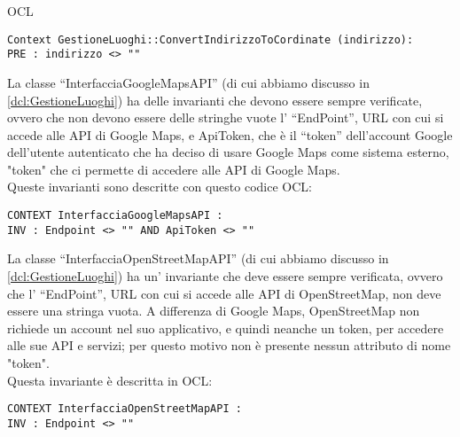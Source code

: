 \begin{listaPersonale}{OCL}
    \begin{lstlisting}
Context GestioneLuoghi::ConvertIndirizzoToCordinate (indirizzo):
PRE : indirizzo <> ""
    \end{lstlisting}




    \begin{center}
        
    \end{center}
    La classe “InterfacciaGoogleMapsAPI” (di cui abbiamo discusso in \ref{dcl:GestioneLuoghi}) ha delle invarianti che devono essere sempre verificate, ovvero che non devono essere delle stringhe vuote l' “EndPoint”, URL con cui si accede alle API di Google Maps, e ApiToken, che è il “token” dell'account Google dell'utente autenticato che ha deciso di usare Google Maps come sistema esterno, "token" che ci permette di accedere alle API di Google Maps.\\
    Queste invarianti sono descritte con questo codice OCL:
    \begin{lstlisting}
CONTEXT InterfacciaGoogleMapsAPI :
INV : Endpoint <> "" AND ApiToken <> ""
    \end{lstlisting}




    \begin{center}
        
    \end{center}
    La classe “InterfacciaOpenStreetMapAPI” (di cui abbiamo discusso in \ref{dcl:GestioneLuoghi}) ha un' invariante che deve essere sempre verificata, ovvero che l' “EndPoint”, URL con cui si accede alle API di OpenStreetMap, non deve essere una stringa vuota. A differenza di Google Maps, OpenStreetMap non richiede un account nel suo applicativo, e quindi neanche un token, per accedere alle sue API e servizi; per questo motivo non è presente nessun attributo di nome "token".\\
    Questa invariante è descritta in OCL:
    \begin{lstlisting}
CONTEXT InterfacciaOpenStreetMapAPI :
INV : Endpoint <> ""
    \end{lstlisting}





\end{listaPersonale}
